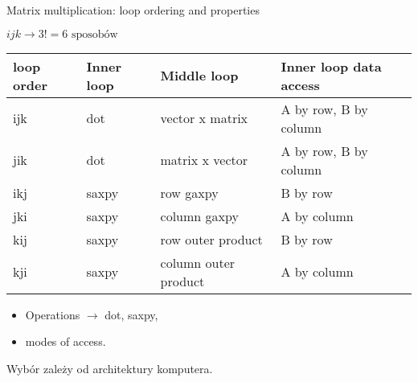 \begin{frame}[fragile]{Matrix multiplication: loop ordering and properties}

$i j k \rightarrow 3! = 6 \text{ sposobów} $ \\ 

\vspace{5px}
\begin{tabular}{ |p{1cm}||p{1.6cm}||p{3.4cm}||p{3.7cm}|  }
 \hline

 loop order& Inner loop & Middle loop&Inner loop data access\\
 \hline
 ijk   & dot   &vector x matrix&   A by row, B by column\\
\hline
 jik&   dot & matrix x vector  &A by row, B by column\\
\hline
 ikj &saxpy & row gaxpy&  B by row\\
\hline
 jki    &saxpy & column gaxpy&  A by column\\
\hline
 kij &   saxpy  & row outer product& B by row\\
\hline
 kji& saxpy  & column outer product & A by column\\
 \hline
\end{tabular}

\begin{itemize}
\item Operations $\rightarrow$ dot, saxpy,
\item modes of access.
\end{itemize}

Wybór zależy od architektury komputera.
\end{frame}
